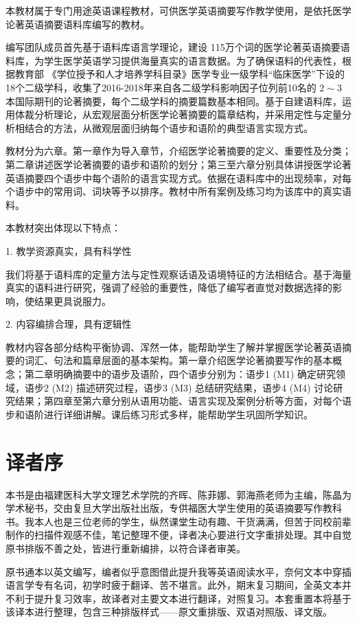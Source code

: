 \documentclass[a4paper]{ctexbook}
\begin{document}
本教材属于专门用途英语课程教材，可供医学英语摘要写作教学使用，是依托医学论著英语摘要语料库编写的教材。

编写团队成员首先基于语料库语言学理论，建设 115万个词的医学论著英语摘要语料库，为学生医学英语学习提供海量真实的语言数据。为了确保语料的代表性，根据教育部 《学位授予和人才培养学科目录》医学专业一级学科“临床医学”下设的18个二级学科，收集了2016-2018年来自各二级学科影响因子位列前10名的 $2 \sim 3$ 本国际期刊的论著摘要，每个二级学科的摘要篇数基本相同。基于自建语料库，运用体裁分析理论，从宏观层面分析医学论著摘要的篇章结构，并采用定性与定量分析相结合的方法，从微观层面归纳每个语步和语阶的典型语言实现方式。

教材分为六章。第一章作为导入章节，介绍医学论著摘要的定义、重要性及分类；第二章讲述医学论著摘要的语步和语阶的划分；第三至六章分别具体讲授医学论著英语摘要四个语步中每个语阶的语言实现方式。依据在语料库中的出现频率，对每个语步中的常用词、词块等予以排序。教材中所有案例及练习均为该库中的真实语料。

本教材突出体现以下特点： 

1. 教学资源真实，具有科学性 

我们将基于语料库的定量方法与定性观察话语及语境特征的方法相结合。基于海量真实的语料进行研究，强调了经验的重要性，降低了编写者直觉对数据选择的影响，使结果更具说服力。

2. 内容编排合理，具有逻辑性 

教材内容各部分结构平衡协调、浑然一体，能帮助学生了解并掌握医学论著英语摘要的词汇、句法和篇章层面的基本架构。第一章介绍医学论著摘要写作的基本概念；第二章明确摘要中的语步及语阶，四个语步分别为：语步1 (M1) 确定研究领域，语步2 (M2) 描述研究过程，语步3 (M3) 总结研究结果，语步4 (M4) 讨论研究结果；第四章至第六章分别从语用功能、语言实现及案例分析等方面，对每个语步和语阶进行详细讲解。课后练习形式多样，能帮助学生巩固所学知识。

\chapter*{译者序}


本书是由福建医科大学文理艺术学院的齐晖、陈菲娜、郭海燕老师为主编，陈晶为学术秘书，交由复旦大学出版社出版，专供福医大学生使用的英语摘要写作教科书。我本人也是三位老师的学生，纵然课堂生动有趣、干货满满，但苦于同校前辈制作的扫描件观感不佳，笔记整理不便，译者决心要进行文字重排处理。其中自觉原书排版不善之处，皆进行重新编排，以符合译者审美。

原书通本以英文编写，编者似乎意图借此提升我等英语阅读水平，奈何文本中穿插语言学专有名词，初学时疲于翻译、苦不堪言。此外，期末复习期间，全英文本并不利于提升复习效率，故译者对主要文本进行翻译，对照复习。本套重置本将基于该译本进行整理，包含三种排版样式——原文重排版、双语对照版、译文版。
\end{document}

